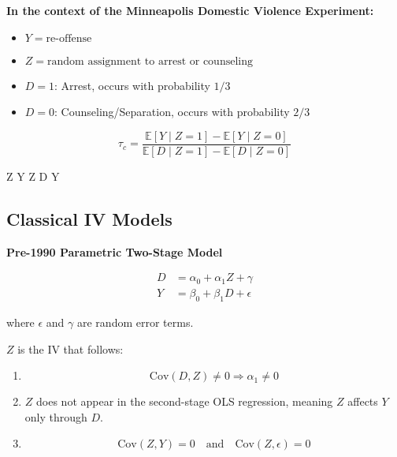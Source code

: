 \bigskip

\textbf{In the context of the Minneapolis Domestic Violence Experiment:}
\begin{itemize}
    \item \(Y = \text{re-offense}\)
    \item \(Z = \text{random assignment to arrest or counseling}\)
    \item \(D = 1\): Arrest, occurs with probability \(1/3\)
    \item \(D = 0\): Counseling/Separation, occurs with probability \(2/3\)
\end{itemize}

\[
\tau_c = \frac{\mathbb{E}[Y \mid Z = 1] - \mathbb{E}[Y \mid Z = 0]}{\mathbb{E}[D \mid Z = 1] - \mathbb{E}[D \mid Z = 0]}
\]


 Z \to Y \quad {} \quad Z \to D \to Y

\subsection{Classical IV Models}

\textbf{Pre-1990 Parametric Two-Stage Model}

\begin{align*}
    D &= \alpha_0 + \alpha_1 Z + \gamma \tag{A} \\
    Y &= \beta_0 + \beta_1 D + \epsilon \tag{A}
\end{align*}

where \(\epsilon\) and \(\gamma\) are random error terms.

\(Z\) is the IV that follows:
\begin{enumerate}
    \item {} 
    \[
    \text{Cov}(D, Z) \neq 0 \Rightarrow \alpha_1 \neq 0
    \]
    \item {} \(Z\) does not appear in the second-stage OLS regression, meaning \(Z\) affects \(Y\) only through \(D\).

    \item {} 
    \[
    \text{Cov}(Z, Y) = 0 \quad \text{and} \quad \text{Cov}(Z, \epsilon) = 0
    \]
\end{enumerate}

